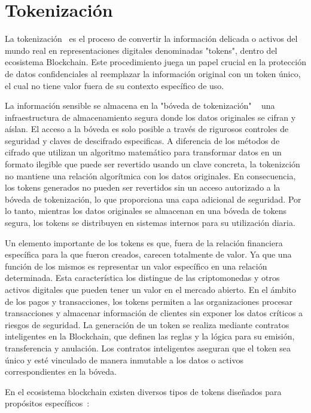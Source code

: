 \section{Tokenización}

La tokenización~\cite{tokenización} es el proceso de convertir la información delicada o activos del mundo real en representaciones digitales denominadas "tokens", dentro del ecosistema Blockchain.
Este procedimiento juega un papel crucial en la protección de datos confidenciales al reemplazar la información original con un token único, el cual no tiene valor fuera de su contexto específico de uso.

La información sensible se almacena en la "bóveda de tokenización" ~\cite{bóvedaTokenización} una infraestructura de almacenamiento segura donde los datos originales se cifran y aíslan. El acceso a la bóveda es solo posible a través de rigurosos controles de seguridad y claves de descifrado especificas.
A diferencia de los métodos de cifrado que utilizan un algoritmo matemático para transformar datos en un formato ilegible que puede ser revertido usando un clave concreta, la tokenizción no mantiene una relación algorítmica con los datos originales. En consecuencia, los tokens generados no pueden ser revertidos sin un acceso autorizado a la bóveda de tokenización, lo que proporciona una capa adicional de seguridad.
Por lo tanto, mientras los datos originales se almacenan en una bóveda de tokens segura, los tokens se distribuyen en sistemas internos para su utilización diaria.

Un elemento importante de los tokens es que, fuera de la relación financiera específica para la que fueron creados, carecen totalmente de valor. Ya que una función de los mismos es representar un valor específico en una relación determinada. Esta característica los distingue de las criptomonedas y otros activos digitales que pueden tener un valor en el mercado abierto.
En el ámbito de los pagos y transacciones, los tokens permiten a las organizaciones procesar transacciones y almacenar información de clientes sin exponer los datos críticos a riesgos de seguridad.
La generación de un token se realiza mediante contratos inteligentes en la Blockchain, que definen las reglas y la lógica para su emisión, transferencia y anulación. Los contratos inteligentes aseguran que el token sea único y esté vinculado de manera inmutable a los datos o activos correspondientes en la bóveda.

En el ecosistema blockchain existen diversos tipos de tokens diseñados para propósitos específicos~\cite{tiposToken}:

